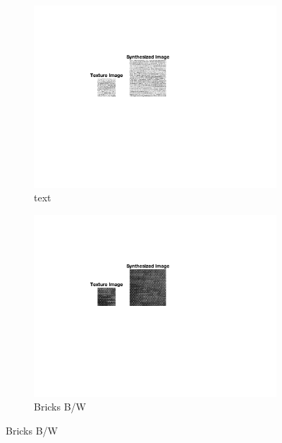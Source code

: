 \documentclass[10pt,twocolumn,letterpaper]{article}
\begin{document}
\begin{figure}
\begin{subfigure}[h]{0.33\textwidth}
    \end{subfigure}
    \hfill
    \begin{subfigure}[h]{0.33\textwidth}
       \centering
       \includegraphics[trim={4.5cm 7cm 8.0cm 3cm}, clip, scale=1.5, width=\textwidth]{../results/syn_final/result_text_B_40.png}
       \caption{text}
       \label{fig:text_res}
   \end{subfigure}
   \hfill
   \begin{subfigure}[h]{0.33\textwidth}
       \centering
       \includegraphics[trim={4.5cm 7cm 8.0cm 3cm}, clip, scale=1.5, width=\textwidth]{../results/syn_final/result_D1_B_40.png}
       \caption{Bricks B/W}
       \label{fig:bricksbw_res}
   \end{subfigure}

\end{figure}
\end{document}
